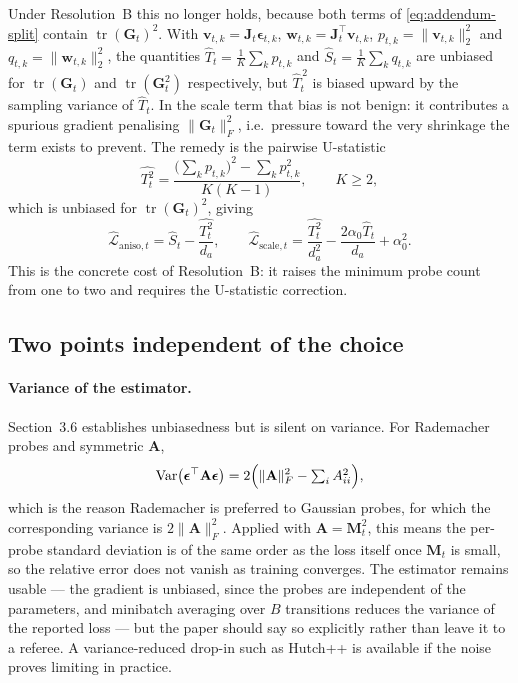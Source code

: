 ﻿\documentclass{article}
\begin{document}
Under Resolution~B this no longer holds, because both terms of
\eqref{eq:addendum-split} contain $\operatorname{tr}(\mathbf{G}_t)^2$. With
$\mathbf{v}_{t,k}=\mathbf{J}_t\boldsymbol\epsilon_{t,k}$,
$\mathbf{w}_{t,k}=\mathbf{J}_t^\top\mathbf{v}_{t,k}$,
$p_{t,k}=\|\mathbf{v}_{t,k}\|_2^2$ and $q_{t,k}=\|\mathbf{w}_{t,k}\|_2^2$, the
quantities $\widehat T_t=\frac1K\sum_k p_{t,k}$ and
$\widehat S_t=\frac1K\sum_k q_{t,k}$ are unbiased for
$\operatorname{tr}(\mathbf{G}_t)$ and $\operatorname{tr}(\mathbf{G}_t^2)$
respectively, but $\widehat T_t^{\,2}$ is biased upward by the sampling
variance of $\widehat T_t$. In the scale term that bias is not benign: it
contributes a spurious gradient penalising $\|\mathbf{G}_t\|_F^2$, i.e.\
pressure toward the very shrinkage the term exists to prevent. The remedy is
the pairwise U-statistic
\[
  \widehat{T^2_t}
  =\frac{\bigl(\sum_{k}p_{t,k}\bigr)^2-\sum_{k}p_{t,k}^2}{K(K-1)},
  \qquad K\ge 2,
\]
which is unbiased for $\operatorname{tr}(\mathbf{G}_t)^2$, giving
\[
  \widehat{\mathcal{L}}_{\text{aniso},t}=\widehat S_t-\frac{\widehat{T^2_t}}{d_a},
  \qquad
  \widehat{\mathcal{L}}_{\text{scale},t}
  =\frac{\widehat{T^2_t}}{d_a^2}-\frac{2\alpha_0\widehat T_t}{d_a}+\alpha_0^2.
\]
This is the concrete cost of Resolution~B: it raises the minimum probe count
from one to two and requires the U-statistic correction.

\subsection{Two points independent of the choice}
\label{sec:addendum-independent}

\paragraph{Variance of the estimator.}
Section~3.6 establishes unbiasedness but is silent on variance. For
Rademacher probes and symmetric $\mathbf{A}$,
\[
  \operatorname{Var}\bigl(\boldsymbol\epsilon^\top\mathbf{A}\boldsymbol\epsilon\bigr)
  =2\Bigl(\|\mathbf{A}\|_F^2-\textstyle\sum_i A_{ii}^2\Bigr),
\]
which is the reason Rademacher is preferred to Gaussian probes, for which the
corresponding variance is $2\|\mathbf{A}\|_F^2$. Applied with
$\mathbf{A}=\mathbf{M}_t^2$, this means the per-probe standard deviation is of
the same order as the loss itself once $\mathbf{M}_t$ is small, so the
relative error does not vanish as training converges. The estimator remains
usable --- the gradient is unbiased, since the probes are independent of the
parameters, and minibatch averaging over $B$ transitions reduces the variance
of the reported loss --- but the paper should say so explicitly rather than
leave it to a referee. A variance-reduced drop-in such as Hutch++ is
available if the noise proves limiting in practice.
\end{document}
